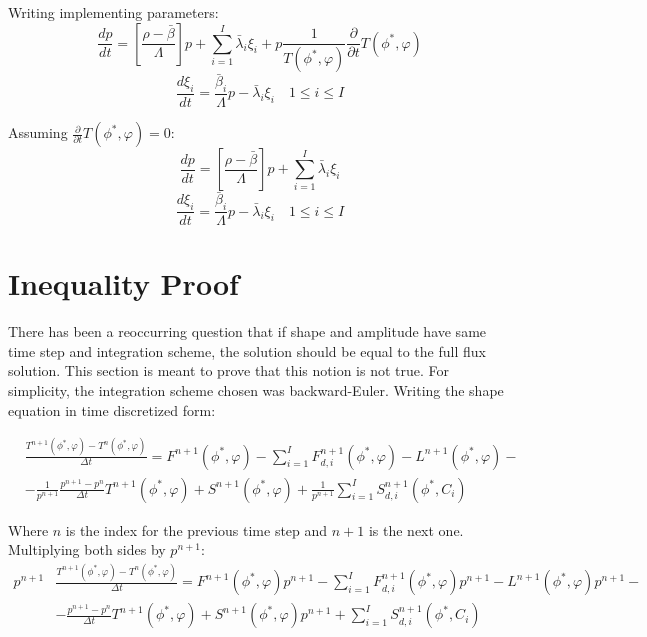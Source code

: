 \documentclass[11pt]{tamurmemo}
\newcommand{\be}{\begin{equation}}
\newcommand{\ee}{\end{equation}}
\begin{document}
Writing implementing parameters:
\be
\frac{dp}{dt}=\left[\frac{\rho-\bar{\beta}}{\Lambda}\right]p + \sum_{i=1}^I\bar{\lambda}_i\xi_i + p\frac{1}{T(\phi^{*},\varphi)}\frac{\partial}{\partial t} T(\phi^{*},\varphi)
\ee
\be
\frac{d\xi_i}{dt}=\frac{\bar{\beta}_i}{\Lambda}p-\bar{\lambda}_i\xi_i \quad 1 \le i \le I 
\ee

Assuming $\frac{\partial}{\partial t} T(\phi^{*},\varphi) = 0$:
\be
\frac{dp}{dt}=\left[\frac{\rho-\bar{\beta}}{\Lambda}\right]p+\sum_{i=1}^I\bar{\lambda}_i\xi_i
\label{eq:p}
\ee
\be
\frac{d\xi_i}{dt}=\frac{\bar{\beta}_i}{\Lambda}p-\bar{\lambda}_i\xi_i \quad 1 \le i \le I 
\label{eq:xi}
\ee

\section{Inequality Proof}

There has been a reoccurring question that if shape and amplitude have same time step and integration scheme, the solution should be equal to the full flux solution.  This section is meant to prove that this notion is not true.  For simplicity, the integration scheme chosen was backward-Euler.  Writing the shape equation in time discretized form:

\begin{align}
&\frac{T^{n+1}(\phi^{*},\varphi)-T^{n}(\phi^{*},\varphi)}{\Delta t} = F^{n+1}(\phi^{*},\varphi) - \sum_{i=1}^I F_{d,i}^{n+1}(\phi^{*},\varphi) - L^{n+1}(\phi^{*},\varphi) -  \nonumber \\
&- \frac{1}{p^{n+1}}\frac{p^{n+1} - p^n}{\Delta t}T^{n+1}(\phi^{*},\varphi) + S^{n+1}(\phi^{*},\varphi) + \frac{1}{p^{n+1}}\sum_{i=1}^I S_{d,i}^{n+1}(\phi^{*},C_i)
\end{align}

Where $n$ is the index for the previous time step and $n+1$ is the next one.  Multiplying both sides by $p^{n+1}$:
\begin{align}
p^{n+1}&\frac{T^{n+1}(\phi^{*},\varphi)-T^{n}(\phi^{*},\varphi)}{\Delta t} = F^{n+1}(\phi^{*},\varphi)p^{n+1} - \sum_{i=1}^I F_{d,i}^{n+1}(\phi^{*},\varphi)p^{n+1} - L^{n+1}(\phi^{*},\varphi)p^{n+1} -  \nonumber \\
&- \frac{p^{n+1} - p^n}{\Delta t}T^{n+1}(\phi^{*},\varphi) + S^{n+1}(\phi^{*},\varphi)p^{n+1} + \sum_{i=1}^I S_{d,i}^{n+1}(\phi^{*},C_i)
\end{align}
\end{document}
